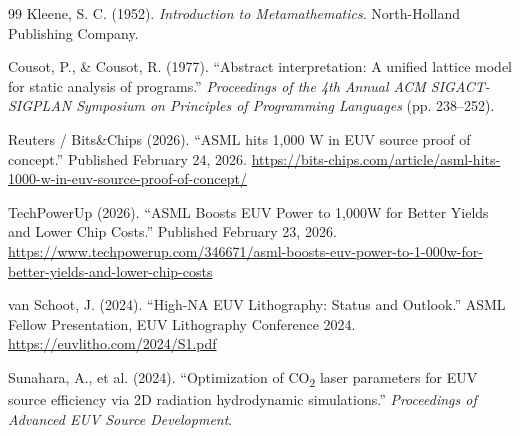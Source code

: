 \documentclass[twocolumn]{article}
\begin{document}
\begin{thebibliography}{99}
Kleene, S. C. (1952).
\textit{Introduction to Metamathematics}.
North-Holland Publishing Company.

Cousot, P., \& Cousot, R. (1977).
``Abstract interpretation: A unified lattice model for static analysis of programs.''
\textit{Proceedings of the 4th Annual ACM SIGACT-SIGPLAN Symposium on Principles of Programming Languages} (pp. 238--252).

Reuters / Bits\&Chips (2026).
``ASML hits 1,000 W in EUV source proof of concept.''
Published February 24, 2026. \url{https://bits-chips.com/article/asml-hits-1000-w-in-euv-source-proof-of-concept/}

TechPowerUp (2026).
``ASML Boosts EUV Power to 1,000W for Better Yields and Lower Chip Costs.''
Published February 23, 2026. \url{https://www.techpowerup.com/346671/asml-boosts-euv-power-to-1-000w-for-better-yields-and-lower-chip-costs}

van Schoot, J. (2024).
``High-NA EUV Lithography: Status and Outlook.''
ASML Fellow Presentation, EUV Lithography Conference 2024.
\url{https://euvlitho.com/2024/S1.pdf}

Sunahara, A., et al. (2024).
``Optimization of CO\textsubscript{2} laser parameters for EUV source efficiency via 2D radiation hydrodynamic simulations.''
\textit{Proceedings of Advanced EUV Source Development}.

\end{thebibliography}
\end{document}
